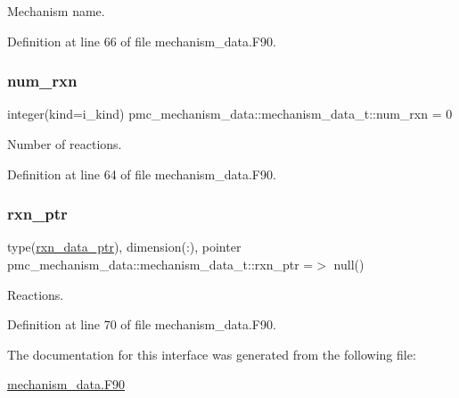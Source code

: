 Mechanism name. 



Definition at line 66 of file mechanism\+\_\+data.\+F90.

\mbox{\label{structpmc__mechanism__data_1_1mechanism__data__t_a755798bd522ac8a02aa80be61ebf9883}} 
\subsubsection{\texorpdfstring{num\+\_\+rxn}{num\_rxn}}
{\footnotesize\ttfamily integer(kind=i\+\_\+kind) pmc\+\_\+mechanism\+\_\+data\+::mechanism\+\_\+data\+\_\+t\+::num\+\_\+rxn = 0\hspace{0.3cm}{\ttfamily [private]}}



Number of reactions. 



Definition at line 64 of file mechanism\+\_\+data.\+F90.

\mbox{\label{structpmc__mechanism__data_1_1mechanism__data__t_ae58d8744533b4144cec67da07bd30183}} 
\subsubsection{\texorpdfstring{rxn\+\_\+ptr}{rxn\_ptr}}
{\footnotesize\ttfamily type(\mbox{\hyperlink{structpmc__rxn__data_1_1rxn__data__ptr}{rxn\+\_\+data\+\_\+ptr}}), dimension(\+:), pointer pmc\+\_\+mechanism\+\_\+data\+::mechanism\+\_\+data\+\_\+t\+::rxn\+\_\+ptr =$>$ null()\hspace{0.3cm}{\ttfamily [private]}}



Reactions. 



Definition at line 70 of file mechanism\+\_\+data.\+F90.



The documentation for this interface was generated from the following file\+:\begin{DoxyCompactItemize}
\item 
\mbox{\hyperlink{mechanism__data_8_f90}{mechanism\+\_\+data.\+F90}}\end{DoxyCompactItemize}
